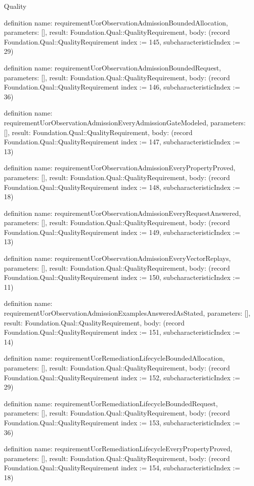 \begin{lexlean}{Quality}
\begin{semanticmodule}
definition{
  name: requirementUorObservationAdmissionBoundedAllocation,
  parameters: [],
  result: Foundation.Qual::QualityRequirement,
  body: (record Foundation.Qual::QualityRequirement {index := 145, subcharacteristicIndex := 29})
}

definition{
  name: requirementUorObservationAdmissionBoundedRequest,
  parameters: [],
  result: Foundation.Qual::QualityRequirement,
  body: (record Foundation.Qual::QualityRequirement {index := 146, subcharacteristicIndex := 36})
}

definition{
  name: requirementUorObservationAdmissionEveryAdmissionGateModeled,
  parameters: [],
  result: Foundation.Qual::QualityRequirement,
  body: (record Foundation.Qual::QualityRequirement {index := 147, subcharacteristicIndex := 13})
}

definition{
  name: requirementUorObservationAdmissionEveryPropertyProved,
  parameters: [],
  result: Foundation.Qual::QualityRequirement,
  body: (record Foundation.Qual::QualityRequirement {index := 148, subcharacteristicIndex := 18})
}

definition{
  name: requirementUorObservationAdmissionEveryRequestAnswered,
  parameters: [],
  result: Foundation.Qual::QualityRequirement,
  body: (record Foundation.Qual::QualityRequirement {index := 149, subcharacteristicIndex := 13})
}

definition{
  name: requirementUorObservationAdmissionEveryVectorReplays,
  parameters: [],
  result: Foundation.Qual::QualityRequirement,
  body: (record Foundation.Qual::QualityRequirement {index := 150, subcharacteristicIndex := 11})
}

definition{
  name: requirementUorObservationAdmissionExamplesAnsweredAsStated,
  parameters: [],
  result: Foundation.Qual::QualityRequirement,
  body: (record Foundation.Qual::QualityRequirement {index := 151, subcharacteristicIndex := 14})
}

definition{
  name: requirementUorRemediationLifecycleBoundedAllocation,
  parameters: [],
  result: Foundation.Qual::QualityRequirement,
  body: (record Foundation.Qual::QualityRequirement {index := 152, subcharacteristicIndex := 29})
}

definition{
  name: requirementUorRemediationLifecycleBoundedRequest,
  parameters: [],
  result: Foundation.Qual::QualityRequirement,
  body: (record Foundation.Qual::QualityRequirement {index := 153, subcharacteristicIndex := 36})
}

definition{
  name: requirementUorRemediationLifecycleEveryPropertyProved,
  parameters: [],
  result: Foundation.Qual::QualityRequirement,
  body: (record Foundation.Qual::QualityRequirement {index := 154, subcharacteristicIndex := 18})
}


\end{semanticmodule}
\end{lexlean}
